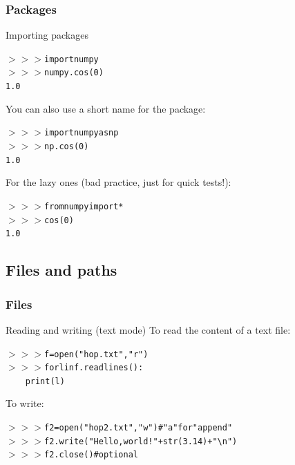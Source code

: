 \documentclass[xcolor=pdftex,dvipsnames,table,mathserif]{beamer}
\begin{document}
\begin{frame}
  \frametitle{Packages}
  \begin{block}{Importing packages}
    \begin{alltt}
      $>>>$ import numpy\\
      $>>>$ numpy.cos(0)\\
      1.0
    \end{alltt}
    You can also use a short name for the package:
    \begin{alltt}
      $>>>$ import numpy as np\\
      $>>>$ np.cos(0)\\
      1.0
    \end{alltt}
    For the lazy ones (bad practice, just for quick tests!):
    \begin{alltt}
      $>>>$ from numpy import *\\
      $>>>$ cos(0)\\
      1.0
    \end{alltt}
  \end{block}

\end{frame}

\subsection{Files and paths}
\begin{frame}
  \frametitle{Files}

  \begin{block}{Reading and writing (text mode)}
    To read the content of a text file:
    \begin{alltt}
      $>>>$ f = open( "hop.txt" , "r" )\\
      $>>>$ for l in f.readlines():\\
      ~~~~    print(l)
    \end{alltt}
    To write:
    \begin{alltt}
      $>>>$ f2 = open( "hop2.txt" , "w" )  \# "a" for "append"\\
      $>>>$ f2.write( "Hello, world!" + str( 3.14 ) + "\textbackslash n" )\\
      $>>>$ f2.close()                     \# optional
    \end{alltt}

  \end{block}
\end{frame}
\end{document}
